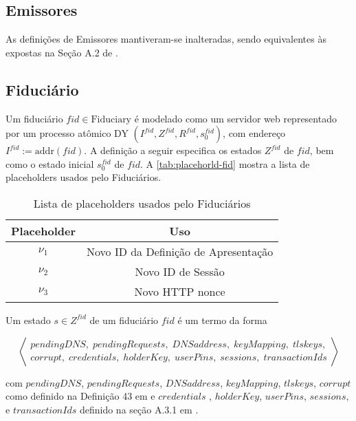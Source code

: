 

\subsection{Emissores}
As definições de Emissores mantiveram-se inalteradas, sendo equivalentes às expostas na Seção A.2 de \cite{hauck2023openid}.

\subsection{Fiduciário}
Um fiduciário \( fid \in \text{Fiduciary} \) é modelado como um servidor web representado por um processo atômico DY \( (I^{fid}, Z^{fid}, R^{fid}, s^{fid}_0) \), com endereço \( I^{fid} := \text{addr}(fid) \). A definição a seguir especifica os estados \( Z^{fid} \) de \( fid \), bem como o estado inicial \( s^{fid}_0 \) de \( fid \). A \autoref{tab:placehorld-fid} mostra a lista de placeholders usados pelo Fiduciários.

\begin{table}[h]
    \centering
    \begin{tabular}{cc}
        \hline
        Placeholder & Uso \\ 
        \hline
        $\nu_1$ & Novo ID da Definição de Apresentação \\
        \hline
        $\nu_2$ & Novo ID de Sessão \\
        \hline
        $\nu_3$ & Novo HTTP nonce \\
        \hline
    \end{tabular}
    \caption{Lista de placeholders usados pelo Fiduciários}
    \label{tab:placehorld-fid}
\end{table}

\begin{definicao}
Um estado $s \in Z^{fid}$ de um fiduciário $fid$ é um termo da forma

\[
\left\langle 
\begin{array}{l}
pendingDNS, \; pendingRequests,\; DNSaddress, \; keyMapping, \; tlskeys, \\
corrupt, \; credentials, \; holderKey, \; userPins, \; sessions,\; transactionIds 
\end{array}
\right\rangle
\]

com $pendingDNS$, $pendingRequests$, $DNSaddress$, $keyMapping$, $tlskeys$, $corrupt$ como definido na Definição 43 em \cite{FettKS14} e 
$credentials$ , $holderKey$, $userPins$, $sessions$, e $transactionIds$ definido na seção {A.3.1} em \cite{hauck2023openid}.

\end{definicao}

